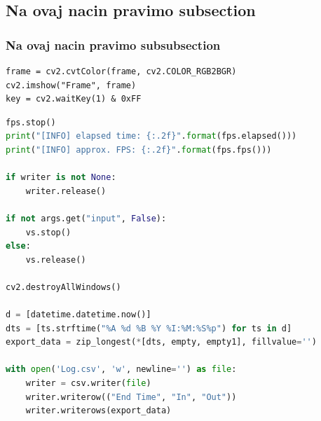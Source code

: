 \documentclass[10pt]{article}
\begin{document}
\subsection{Na ovaj nacin pravimo subsection }







\subsubsection{Na ovaj nacin pravimo subsubsection}








\pagestyle{tptp_stil}
\newpage










\begin{verbatim}
frame = cv2.cvtColor(frame, cv2.COLOR_RGB2BGR)
cv2.imshow("Frame", frame)
key = cv2.waitKey(1) & 0xFF
\end{verbatim}




\begin{lstlisting}[language=Python, caption=Primjer Python koda]
fps.stop()
print("[INFO] elapsed time: {:.2f}".format(fps.elapsed()))
print("[INFO] approx. FPS: {:.2f}".format(fps.fps()))

if writer is not None:
    writer.release()

if not args.get("input", False):
    vs.stop()
else:
    vs.release()

cv2.destroyAllWindows()

d = [datetime.datetime.now()]
dts = [ts.strftime("%A %d %B %Y %I:%M:%S%p") for ts in d]
export_data = zip_longest(*[dts, empty, empty1], fillvalue='')

with open('Log.csv', 'w', newline='') as file:
    writer = csv.writer(file)
    writer.writerow(("End Time", "In", "Out"))
    writer.writerows(export_data)

\end{lstlisting}




 
\end{document}

